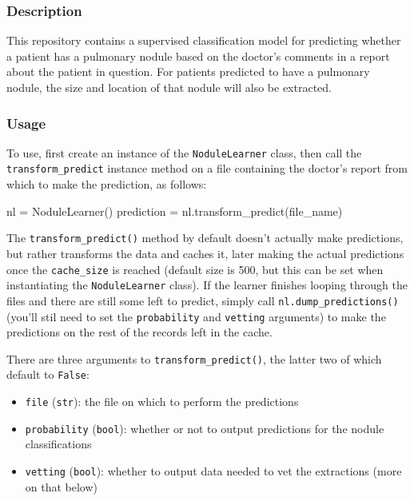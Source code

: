 \documentclass[11pt]{article}
\providecommand{\tightlist}{%
      \setlength{\itemsep}{0pt}\setlength{\parskip}{0pt}}
\newenvironment{Shaded}{}{}
\newcommand{\NormalTok}[1]{{#1}}
\newcommand{\OperatorTok}[1]{\textcolor[rgb]{0.40,0.40,0.40}{{#1}}}
\begin{document}
\subsubsection{Description}\label{description}

This repository contains a supervised classification model for
predicting whether a patient has a pulmonary nodule based on the
doctor's comments in a report about the patient in question. For
patients predicted to have a pulmonary nodule, the size and location of
that nodule will also be extracted.

\subsubsection{Usage}\label{usage}

To use, first create an instance of the \texttt{NoduleLearner} class,
then call the \texttt{transform\_predict} instance method on a file
containing the doctor's report from which to make the prediction, as
follows:

\begin{Shaded}
\begin{Highlighting}[]
\NormalTok{nl }\OperatorTok{=}\NormalTok{ NoduleLearner()}
\NormalTok{prediction }\OperatorTok{=}\NormalTok{ nl.transform_predict(file_name)}
\end{Highlighting}
\end{Shaded}

The \texttt{transform\_predict()} method by default doesn't actually
make predictions, but rather transforms the data and caches it, later
making the actual predictions once the \texttt{cache\_size} is reached
(default size is 500, but this can be set when instantiating the
\texttt{NoduleLearner} class). If the learner finishes looping through
the files and there are still some left to predict, simply call
\texttt{nl.dump\_predictions()} (you'll stil need to set the
\texttt{probability} and \texttt{vetting} arguments) to make the
predictions on the rest of the records left in the cache.

There are three arguments to \texttt{transform\_predict()}, the latter
two of which default to \texttt{False}:

\begin{itemize}
\tightlist
\item
  \texttt{file} (\texttt{str}): the file on which to perform the
  predictions
\item
  \texttt{probability} (\texttt{bool}): whether or not to output
  predictions for the nodule classifications
\item
  \texttt{vetting} (\texttt{bool}): whether to output data needed to vet
  the extractions (more on that below)
\end{itemize}
\end{document}
